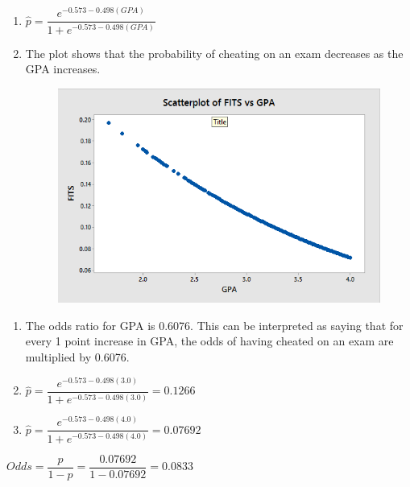 \documentclass{article}
\begin{document}
\begin{enumerate}
\def\labelenumi{\alph{enumi})}
\item
  \(\hat{p} = \dfrac{e^{-0.573 - 0.498(GPA)}}{1 + e^{-0.573 - 0.498(GPA)}}\)
\item
  The plot shows that the probability of cheating on an exam decreases
  as the GPA increases.
  
  \begin{figure}[h!]
 \centering
 \includegraphics[scale=.45]{./images/scatterplot_fits-vs-GPA.png}
\end{figure}

\end{enumerate}

\begin{enumerate}
\def\labelenumi{\alph{enumi})}
\setcounter{enumi}{2}
\item
  The odds ratio for GPA is 0.6076. This can be interpreted as saying
  that for every 1 point increase in GPA, the odds of having cheated on
  an exam are multiplied by 0.6076.
\item
  \(\hat{p} = \dfrac{e^{-0.573 - 0.498(3.0)}}{1 + e^{-0.573 - 0.498(3.0)}} = 0.1266\)
\item
  \(\hat{p} = \dfrac{e^{-0.573 - 0.498(4.0)}}{1 + e^{-0.573 - 0.498(4.0)}} = 0.07692\)
\end{enumerate}

\(Odds = \dfrac{p}{1 - p} = \dfrac{0.07692}{1 - 0.07692} = 0.0833\)
\end{document}
